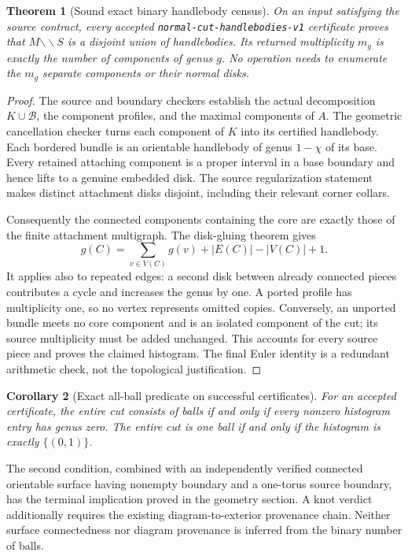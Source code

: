 \documentclass[11pt,a4paper]{article}
\newtheorem{theorem}{Theorem}[section]
\newtheorem{corollary}[theorem]{Corollary}
\theoremstyle{definition}
\newcommand{\code}[1]{\texttt{#1}}
\newcommand{\cut}{\mathbin{\backslash\!\backslash}}
\begin{document}
\begin{theorem}[Sound exact binary handlebody census]
\label{main:census}
On an input satisfying the source contract, every accepted
\code{normal-cut-handlebodies-v1} certificate proves that $M\cut S$ is a
disjoint union of handlebodies.  Its returned multiplicity $m_g$ is exactly
the number of components of genus $g$.  No operation needs to enumerate the
$m_g$ separate components or their normal disks.
\end{theorem}
\begin{proof}
The source and boundary checkers establish the actual decomposition
$K\cup\mathcal B$, the component profiles, and the maximal components of
$A$.  The geometric cancellation checker turns each component of $K$ into
its certified handlebody.  Each bordered bundle is an orientable handlebody
of genus $1-\chi$ of its base.  Every retained attaching component is a
proper interval in a base boundary and hence lifts to a genuine embedded
disk.  The source regularization statement makes distinct attachment disks
disjoint, including their relevant corner collars.

Consequently the connected components containing the core are exactly those
of the finite attachment multigraph.  The disk-gluing theorem gives
\[
  g(C)=\sum_{v\in V(C)}g(v)+|E(C)|-|V(C)|+1.
\]
It applies also to repeated edges: a second disk between already connected
pieces contributes a cycle and increases the genus by one.  A ported profile
has multiplicity one, so no vertex represents omitted copies.  Conversely,
an unported bundle meets no core component and is an isolated component of
the cut; its source multiplicity must be added unchanged.  This accounts
for every source piece and proves the claimed histogram.  The final Euler
identity is a redundant arithmetic check, not the topological justification.
\end{proof}

\begin{corollary}[Exact all-ball predicate on successful certificates]
\label{main:allballs}
For an accepted certificate, the entire cut consists of balls if and only if
every nonzero histogram entry has genus zero.  The entire cut is one ball if
and only if the histogram is exactly $\{(0,1)\}$.
\end{corollary}

The second condition, combined with an independently verified connected
orientable surface having nonempty boundary and a one-torus source boundary,
has the terminal implication proved in the geometry section.  A knot verdict
additionally requires the existing diagram-to-exterior provenance chain.
Neither surface connectedness nor diagram provenance is inferred from the
binary number of balls.
\end{document}

